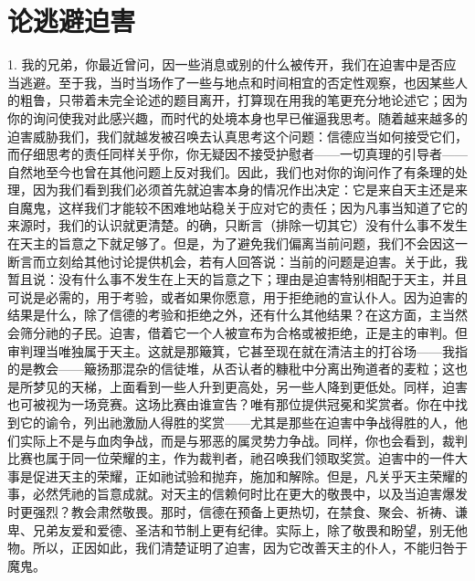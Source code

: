 
\chapter{论逃避迫害}


1. 我的兄弟，你最近曾问，因一些消息或别的什么被传开，我们在迫害中是否应当逃避。至于我，当时当场作了一些与地点和时间相宜的否定性观察，也因某些人的粗鲁，只带着未完全论述的题目离开，打算现在用我的笔更充分地论述它；因为你的询问使我对此感兴趣，而时代的处境本身也早已催逼我思考。随着越来越多的迫害威胁我们，我们就越发被召唤去认真思考这个问题：信德应当如何接受它们，而仔细思考的责任同样关乎你，你无疑因不接受护慰者——一切真理的引导者——自然地至今也曾在其他问题上反对我们。因此，我们也对你的询问作了有条理的处理，因为我们看到我们必须首先就迫害本身的情况作出决定：它是来自天主还是来自魔鬼，这样我们才能较不困难地站稳关于应对它的责任；因为凡事当知道了它的来源时，我们的认识就更清楚。的确，只断言（排除一切其它）没有什么事不发生在天主的旨意之下就足够了。但是，为了避免我们偏离当前问题，我们不会因这一断言而立刻给其他讨论提供机会，若有人回答说：当前的问题是迫害。关于此，我暂且说：没有什么事不发生在上天的旨意之下；理由是迫害特别相配于天主，并且可说是必需的，用于考验，或者如果你愿意，用于拒绝祂的宣认仆人。因为迫害的结果是什么，除了信德的考验和拒绝之外，还有什么其他结果？在这方面，主当然会筛分祂的子民。迫害，借着它一个人被宣布为合格或被拒绝，正是主的审判。但审判理当唯独属于天主。这就是那簸箕，它甚至现在就在清洁主的打谷场——我指的是教会——簸扬那混杂的信徒堆，从否认者的糠秕中分离出殉道者的麦粒；这也是所梦见的天梯，上面看到一些人升到更高处，另一些人降到更低处。同样，迫害也可被视为一场竞赛。这场比赛由谁宣告？唯有那位提供冠冕和奖赏者。你在中找到它的谕令，列出祂激励人得胜的奖赏——尤其是那些在迫害中争战得胜的人，他们实际上不是与血肉争战，而是与邪恶的属灵势力争战。同样，你也会看到，裁判比赛也属于同一位荣耀的主，作为裁判者，祂召唤我们领取奖赏。迫害中的一件大事是促进天主的荣耀，正如祂试验和抛弃，施加和解除。但是，凡关乎天主荣耀的事，必然凭祂的旨意成就。对天主的信赖何时比在更大的敬畏中，以及当迫害爆发时更强烈？教会肃然敬畏。那时，信德在预备上更热切，在禁食、聚会、祈祷、谦卑、兄弟友爱和爱德、圣洁和节制上更有纪律。实际上，除了敬畏和盼望，别无他物。所以，正因如此，我们清楚证明了迫害，因为它改善天主的仆人，不能归咎于魔鬼。\par


